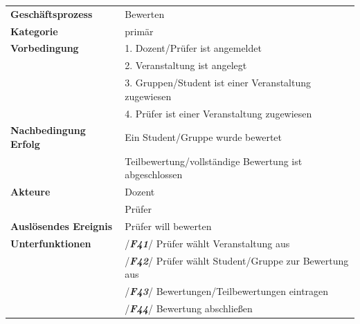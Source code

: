 	
			\begin{table}[H]
			\begin{tabular}{|ll}
				\rowcolor{hellgrau}\multicolumn{2}{l}{/\textbf{\textit{F40}}/}\\\hline
				 \textbf{Geschäftsprozess} & Bewerten \\ 
				 \textbf{Kategorie} & primär \\ 
				 \textbf{Vorbedingung} & 1. Dozent/Prüfer ist angemeldet  \\ 
				 & 2. Veranstaltung ist angelegt\\
				 & 3. Gruppen/Student ist einer Veranstaltung zugewiesen\\
				 & 4. Prüfer ist einer Veranstaltung zugewiesen\\
				 \textbf{Nachbedingung Erfolg\phantom{xxxx}} & Ein Student/Gruppe wurde bewertet\\
				 & Teilbewertung/vollständige Bewertung ist abgeschlossen\\ 
				 \textbf{Akteure} & Dozent \\ 
				 & Prüfer\\
				 \textbf{Auslösendes Ereignis} & Prüfer will bewerten \\ 
				 \textbf{Unterfunktionen} &  /\textbf{\textit{F41}}/ Prüfer wählt Veranstaltung aus\\
				 & /\textbf{\textit{F42}}/ Prüfer wählt Student/Gruppe zur Bewertung aus\\
				 &/\textbf{\textit{F43}}/  Bewertungen/Teilbewertungen eintragen\\
				 & /\textbf{\textit{F44}}/ Bewertung abschließen\\
			
				 \end{tabular} 
			\label{tab:F40}
			\end{table}
			
